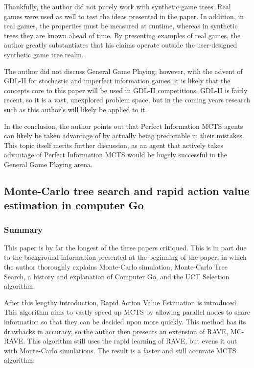 \documentclass[letterpaper]{article}
\begin{document}
Thankfully, the author did not purely work with synthetic game trees. Real games were used as well to test the ideas presented in the paper. In addition, in real games, the properties must be measured at runtime, whereas in synthetic trees they are known ahead of time. By presenting examples of real games, the author greatly substantiates that his claims operate outside the user-designed synthetic game tree realm.

The author did not discuss General Game Playing; however, with the advent of GDL-II for stochastic and imperfect information games, it is likely that the concepts core to this paper will be used in GDL-II competitions. GDL-II is fairly recent, so it is a vast, unexplored problem space, but in the coming years research such as this author's will likely be applied to it.

In the conclusion, the author points out that Perfect Information MCTS agents can likely be taken advantage of by actually being predictable in their mistakes. This topic itself merits further discussion, as an agent that actively takes advantage of Perfect Information MCTS would be hugely successful in the General Game Playing arena.

\subsection{Monte-Carlo tree search and rapid action value estimation in computer Go}

\subsubsection{Summary}
This paper \cite{gelly2011monte} is by far the longest of the three papers critiqued. This is in part due to the background information presented at the beginning of the paper, in which the author thoroughly explains Monte-Carlo simulation, Monte-Carlo Tree Search, a history and explanation of Computer Go, and the UCT Selection algorithm.

After this lengthy introduction, Rapid Action Value Estimation is introduced. This algorithm aims to vastly speed up MCTS by allowing parallel nodes to share information so that they can be decided upon more quickly. This method has its drawbacks in accuracy, so the author then presents an extension of RAVE, MC-RAVE. This algorithm still uses the rapid learning of RAVE, but evens it out with Monte-Carlo simulations. The result is a faster and still accurate MCTS algorithm.
\end{document}
